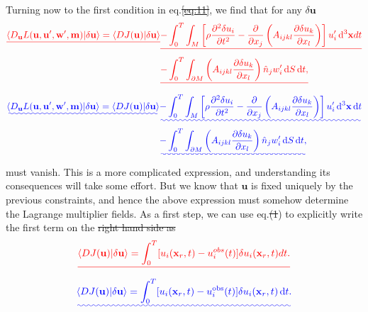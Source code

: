 \documentclass[a4paper,12pt]{paper}
\providecommand{\DIFadd}[1]{{\protect\color{blue}\uwave{#1}}} %
\providecommand{\DIFdel}[1]{{\protect\color{red}\sout{#1}}}                      %
\providecommand{\DIFaddbegin}{} %
\providecommand{\DIFaddend}{} %
\providecommand{\DIFdelbegin}{} %
\providecommand{\DIFdelend}{} %
\begin{document}
Turning now to the first condition in eq.\DIFdelbegin \DIFdel{\eqref{eq:11}}\DIFdelend \DIFaddbegin \DIFadd{~(\ref{eq:11})}\DIFaddend , we find that for any $\delta \mathbf{u}$
\DIFdelbegin \begin{align*}
\DIFdel{\langle D_{\mathbf{u}}L(\mathbf{u},\mathbf{u}',\mathbf{w}',\mathbf{m})|\delta \mathbf{u}\rangle = \langle DJ(\mathbf{u})|\delta \mathbf{u}\rangle }&\DIFdel{- \int_{0}^{T}\int_{M}\left[\rho\frac{\partial^{2}\delta u_{i}}{\partial t^{2}}-\frac{\partial}{\partial x_{j}}
\left(A_{ijkl}\frac{\partial\delta u_{k}}{\partial x_{l}}\right)\right]u_{i}'\dd^{3}\mathbf{x}dt \nonumber }\\
&\DIFdel{- \int_{0}^{T}\int_{\partial M}\left(A_{ijkl}\frac{\partial\delta u_{k}}{\partial x_{l}}\right)\hat{n}_{j}w_{i}'\dd S\dd t,
}\end{align*}%
\DIFdelend \DIFaddbegin \begin{align}
\DIFadd{\langle D_{\mathbf{u}}L(\mathbf{u},\mathbf{u}',\mathbf{w}',\mathbf{m})|\delta \mathbf{u}\rangle = \langle DJ(\mathbf{u})|\delta \mathbf{u}\rangle }&\DIFadd{- \int_{0}^{T}\int_{M}\left[\rho\frac{\partial^{2}\delta u_{i}}{\partial t^{2}}-\frac{\partial}{\partial x_{j}}
\left(A_{ijkl}\frac{\partial\delta u_{k}}{\partial x_{l}}\right)\right]u_{i}'\dd^{3}\mathbf{x}\dd t \nonumber }\\
&\DIFadd{- \int_{0}^{T}\int_{\partial M}\left(A_{ijkl}\frac{\partial\delta u_{k}}{\partial x_{l}}\right)\hat{n}_{j}w_{i}'\dd S\dd t,
\label{eq:16}
}\end{align}\DIFaddend 
must vanish. This is a more complicated expression, and understanding its consequences will take some effort. 
But we know that $\mathbf{u}$ is fixed uniquely by the previous constraints, and hence the above expression 
must somehow determine the Lagrange multiplier fields. As a first step, we can use eq.\DIFdelbegin \DIFdel{(1}\DIFdelend \DIFaddbegin \DIFadd{~(\ref{eq:1}}\DIFaddend ) to explicitly write 
the first term on the \DIFdelbegin \DIFdel{right hand side as
}\begin{displaymath}
\DIFdel{\langle DJ(\mathbf{u})|\delta \mathbf{u}\rangle=\int_{0}^{T}[u_{i}(\mathbf{x}_{r},t)-u_{i}^{obs}(t)]\delta u_{i}(\mathbf{x}_{r},t)dt.
}\end{displaymath}%
\DIFdelend \DIFaddbegin \DIFadd{right-hand side as
}\begin{equation}
\DIFadd{\langle DJ(\mathbf{u})|\delta \mathbf{u}\rangle=\int_{0}^{T}[u_{i}(\mathbf{x}_{r},t)-u_{i}^{\mathrm{obs}}(t)]\delta u_{i}(\mathbf{x}_{r},t)\dd t.
\label{eq:17}
}\end{equation}\DIFaddend 
\end{document}
